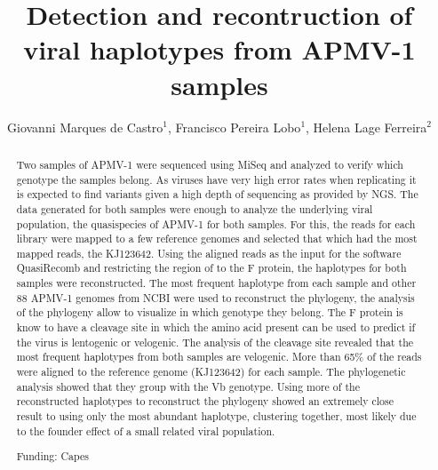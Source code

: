 \documentclass[twoside]{article}
\title{\vspace{-15mm}\fontsize{24pt}{10pt}\selectfont\textbf{Detection and recontruction of viral haplotypes from APMV-1 samples}} %
\author{Giovanni Marques de Castro$^1$, Francisco Pereira Lobo$^1$, Helena Lage Ferreira$^2$}
\affil{1 UFMG\\ 2 USP\\ }
\date{}
\begin{document}
\maketitle %

\thispagestyle{fancy} %


\begin{abstract}
Two samples of APMV-1 were sequenced using MiSeq and analyzed to verify which genotype the samples belong. As viruses have very high error rates when replicating it is expected to find variants given a high depth of sequencing as provided by NGS. The data generated for both samples were enough to analyze the underlying viral population, the quasispecies of APMV-1 for both samples. For this, the reads for each library were mapped to a few reference genomes and selected that which had the most mapped reads, the KJ123642. Using the aligned reads as the input for the software QuasiRecomb and restricting the region of to the F protein, the haplotypes for both samples were reconstructed. The most frequent haplotype from each sample and other 88 APMV-1 genomes from NCBI were used to reconstruct the phylogeny, the analysis of the phylogeny allow to visualize in which genotype they belong. The F protein is know to have a cleavage site in which the amino acid present can be used to predict if the virus is lentogenic or velogenic. The analysis of the cleavage site revealed that the most frequent haplotypes from both samples are velogenic. More than 65\% of the reads were aligned to the reference genome (KJ123642) for each sample. The phylogenetic analysis showed that they group with the Vb genotype. Using more of the reconstructed haplotypes to reconstruct the phylogeny showed an extremely close result to using only the most abundant haplotype, clustering together, most likely due to the founder effect of a small related viral population.

Funding: Capes
\end{abstract}
\end{document}
